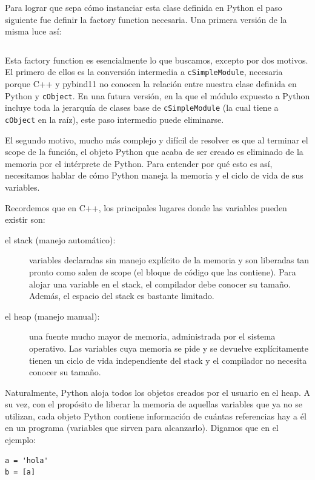 \documentclass[]{article}
\begin{document}
Para lograr que \omnetpp{} sepa cómo instanciar esta clase definida en Python el
paso siguiente fue definir la factory function necesaria. Una primera versión
de la misma luce así:

\inputminted{c++}{codelistings/factory_function.cc}

Esta factory function es esencialmente lo que buscamos, excepto por dos
motivos. El primero de ellos es la conversión intermedia a
\verb!cSimpleModule!, necesaria porque C++ y pybind11 no conocen la relación
entre nuestra clase definida en Python y \verb!cObject!. En una futura versión,
en la que el módulo expuesto a Python incluye toda la jerarquía de clases base
de \verb!cSimpleModule! (la cual tiene a \verb!cObject! en la raíz), este paso
intermedio puede eliminarse.

El segundo motivo, mucho más complejo y difícil de resolver es que al terminar
el scope de la función, el objeto Python que acaba de ser creado es eliminado
de la memoria por el intérprete de Python. Para entender por qué esto es así,
necesitamos hablar de cómo Python maneja la memoria y el ciclo de vida de sus
variables.

Recordemos que en C++, los principales lugares donde las variables pueden
existir son:

\begin{description}
    \item[el stack (manejo automático):] variables declaradas sin manejo
explícito de la memoria y son liberadas tan pronto como salen de scope (el
bloque de código que las contiene). Para alojar una variable en el stack, el
compilador debe conocer su tamaño. Además, el espacio del stack es bastante
limitado.

    \item[el heap (manejo manual):] una fuente mucho mayor de memoria,
administrada por el sistema operativo. Las variables cuya memoria se pide y se
devuelve explícitamente tienen un ciclo de vida independiente del stack y el
compilador no necesita conocer su tamaño.
\end{description}

Naturalmente, Python aloja todos los objetos creados por el usuario en el heap.
A su vez, con el propósito de liberar la memoria de aquellas variables que ya
no se utilizan, cada objeto Python contiene información de cuántas referencias
hay a él en un programa (variables que sirven para alcanzarlo). Digamos que en
el ejemplo:

\begin{verbatim}
a = 'hola'
b = [a]
\end{verbatim}
\end{document}
